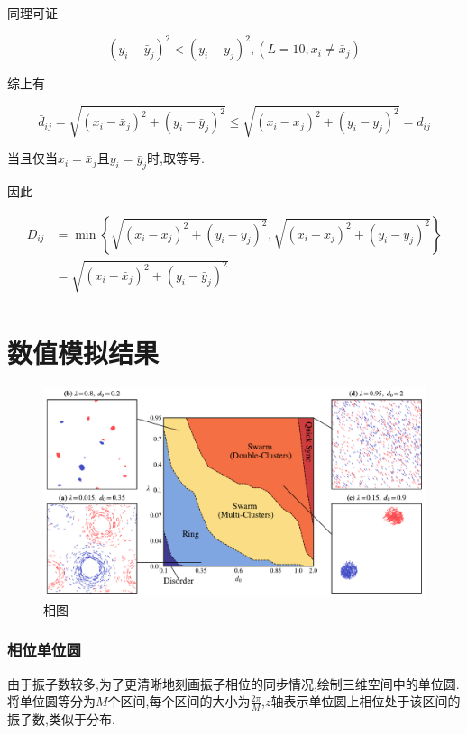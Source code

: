 \documentclass{article}
\begin{document}
同理可证

$$
(y_i-\bar{y}_j)^2<(y_i-y_j)^2, \left( L=10, x_i\ne \bar{x}_j \right)
$$

综上有

$$
\bar{d}_{ij}=\sqrt{(x_i-\bar{x}_j)^2+(y_i-\bar{y}_j)^2}\le \sqrt{(x_i-x_j)^2+(y_i-y_j)^2}=d_{ij}
$$

当且仅当$x_i=\bar{x}_j$且$y_i=\bar{y}_j$时,取等号.

因此

$$
\begin{aligned}
	D_{ij}&=\min \left\{ \sqrt{(x_i-\bar{x}_j)^2+(y_i-\bar{y}_j)^2},\sqrt{(x_i-x_j)^2+(y_i-y_j)^2} \right\}\\
	&=\sqrt{(x_i-\bar{x}_j)^2+(y_i-\bar{y}_j)^2}\\
\end{aligned}
$$

\newpage
\section{数值模拟结果}
\begin{figure}[H]
	\centering
	\includegraphics[width=\textwidth]{./figs/phaseDiagram.pdf}
	\caption{相图}
\end{figure}

\subsubsection{相位单位圆}

由于振子数较多,为了更清晰地刻画振子相位的同步情况,绘制三维空间中的单位圆. 将单位圆等分为$M$个区间,每个区间的大小为$\frac{2\pi}{M}$,$z$轴表示单位圆上相位处于该区间的振子数,类似于分布.
\end{document}
